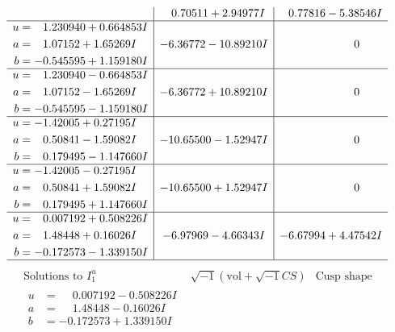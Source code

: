 \documentclass[1p]{elsarticle_modified}
\theoremstyle{definition}
\newcommand{\I}{\sqrt{-1}}
\begin{document}
$$\begin{array}{c|c|c}
 & \phantom{-}0.70511 + 2.94977 I & \phantom{-}0.77816 - 5.38546 I \\ \hline\begin{aligned}
u &= \phantom{-}1.230940 + 0.664853 I \\
a &= \phantom{-}1.07152 + 1.65269 I \\
b &= -0.545595 + 1.159180 I\end{aligned}
 & -6.36772 - 10.89210 I & \phantom{-0.000000 } 0 \\ \hline\begin{aligned}
u &= \phantom{-}1.230940 - 0.664853 I \\
a &= \phantom{-}1.07152 - 1.65269 I \\
b &= -0.545595 - 1.159180 I\end{aligned}
 & -6.36772 + 10.89210 I & \phantom{-0.000000 } 0 \\ \hline\begin{aligned}
u &= -1.42005 + 0.27195 I \\
a &= \phantom{-}0.50841 - 1.59082 I \\
b &= \phantom{-}0.179495 - 1.147660 I\end{aligned}
 & -10.65500 - 1.52947 I & \phantom{-0.000000 } 0 \\ \hline\begin{aligned}
u &= -1.42005 - 0.27195 I \\
a &= \phantom{-}0.50841 + 1.59082 I \\
b &= \phantom{-}0.179495 + 1.147660 I\end{aligned}
 & -10.65500 + 1.52947 I & \phantom{-0.000000 } 0 \\ \hline\begin{aligned}
u &= \phantom{-}0.007192 + 0.508226 I \\
a &= \phantom{-}1.48448 + 0.16026 I \\
b &= -0.172573 - 1.339150 I\end{aligned}
 & -6.97969 - 4.66343 I & -6.67994 + 4.47542 I\\
 \hline 
 \end{array}$$\newpage$$\begin{array}{c|c|c}  
\text{Solutions to }I^u_{1}& \I (\text{vol} + \sqrt{-1}CS) & \text{Cusp shape}\\
 \hline 
\begin{aligned}
u &= \phantom{-}0.007192 - 0.508226 I \\
a &= \phantom{-}1.48448 - 0.16026 I \\
b &= -0.172573 + 1.339150 I\end{aligned}

\end{array}$$
\end{document}
